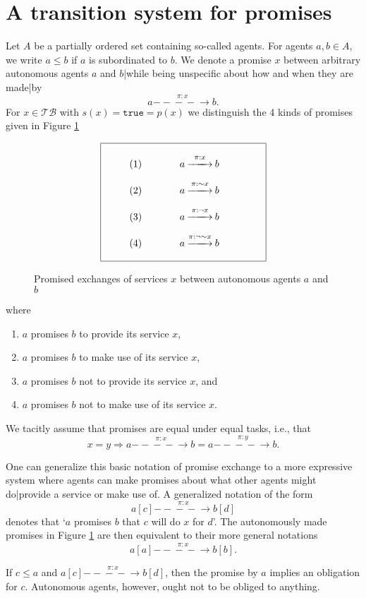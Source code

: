\documentclass{pseudoelsart}
\newcommand{\tr}{{\mathtt{true}}}
\newcommand{\prom}[3]{#1 \overset{\pi:#2}{- \!\!\!- \!\!\!- \!\!\!- \!\!\!\!\!\!\!\!\longrightarrow} #3}
\newcommand{\geb}{{\sim}}
\begin{document}
\section{A transition system for promises}
Let $A$ be a partially ordered set containing so-called agents. For agents $a,b\in A$, we write $a\leq b$ if $a$ is subordinated to $b$.
We denote a promise $x$ between arbitrary autonomous agents $a$ and $b$|while being unspecific about how and 
when they are made|by \[\prom{a}{x}{b}.\]
For $x\in \mathcal{TB}$ with $s(x)=\tr=p(x)$ we distinguish the 4 kinds of promises
given in Figure \ref{4prom}
\begin{figure}[htbp]
\[
\begin{array}{|cll|}
\hline&&\\
\hspace{0.5cm}&(1)\hspace{1 cm}&\prom{a}{x}{b}\hspace{1.5cm}\\[4mm]
&(2)&\prom{a}{\geb  x}{b}\\[4mm]
&(3)&\prom{a}{\neg x}{b}\\[4mm]
&(4)&\prom{a}{\neg \geb   x}{b}\\[4mm]
\hline
\end{array}
\]
\caption{Promised exchanges of services $x$ between autonomous agents $a$ and 
$b$\label{4prom}}
\end{figure}
where
\begin{enumerate}
\item $a$ promises $b$ to provide its service $x$,
\item $a$ promises $b$ to make use of its service $x$,
\item $a$ promises $b$ not to provide its service $x$, and
\item $a$ promises $b$ not to make use of its service $x$.
\end{enumerate}
We tacitly assume that promises are equal under equal tasks, i.e., that
\[
x=y \Rightarrow \prom{a}{x}{b}=\prom{a}{y}{b}.
\]

One can generalize this basic notation of promise exchange to a more expressive system where agents can make promises about what other agents
might do|provide a service or make use of. A generalized notation of the form
\[
\prom{a[c]}{x}{b[d]}
\]
denotes that `$a$ promises $b$ that $c$ will do $x$ for $d$'.
The autonomously made promises in Figure \ref{4prom} are then equivalent to their more general notations
\[
\prom{a[a]}{x}{b[b]}.
\]

If $c\leq a$ and $\prom{a[c]}{x}{b[d]}$, then the promise by $a$ implies an obligation for $c$. Autonomous agents, however, ought not to be obliged to anything.
\end{document}
